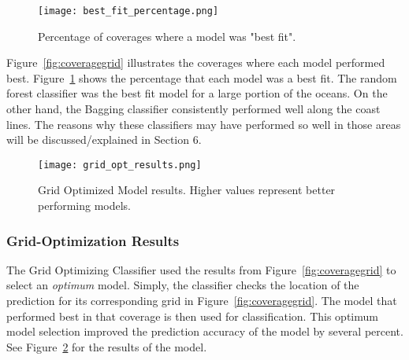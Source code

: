 \begin{figure}[htp]
    \centering
    \texttt{[image: best\_fit\_percentage.png]}
    \caption{Percentage of coverages where a model was "best fit".}
    \label{fig:pie_best_fit}
\end{figure}

\par
Figure~\ref{fig:coveragegrid} illustrates the coverages where each model performed best.
Figure~\ref{fig:pie_best_fit} shows the percentage that each model was a best fit.
The random forest classifier was the best fit model for a large portion of the oceans.
On the other hand, the Bagging classifier consistently performed well along the coast lines.
The reasons why these classifiers may have performed so well in those areas will be discussed/explained in Section 6.


\begin{figure}[htp]
    \centering
    \texttt{[image: grid\_opt\_results.png]}
    \caption{Grid Optimized Model results. Higher values represent better performing models.}
    \label{fig:grid_opt_barplot}
\end{figure}
\subsubsection{Grid-Optimization Results}
The Grid Optimizing Classifier used the results from Figure~\ref{fig:coveragegrid} to select an \textit{optimum} model.
Simply, the classifier checks the location of the prediction for its corresponding grid in Figure~\ref{fig:coveragegrid}.
The model that performed best in that coverage is then used for classification.
This optimum model selection improved the prediction accuracy of the model by several percent.
See Figure~\ref{fig:grid_opt_barplot} for the results of the model.



